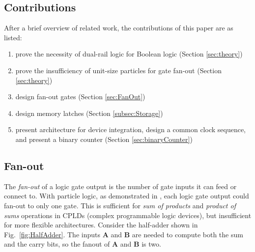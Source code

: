 \documentclass[letterpaper, 10 pt, conference]{ieeeconf}
\begin{document}
    \subsection{Contributions}
  
 After a brief overview of related work,  the contributions of this paper are as listed:
  \begin{enumerate}
  \item prove the necessity of dual-rail logic for Boolean logic (Section \ref{sec:theory})
  \item prove the insufficiency of unit-size particles for gate fan-out (Section \ref{sec:theory})
  \item design {\sc fan-out} gates (Section \ref{sec:FanOut})
  \item design memory latches (Section \ref{subsec:Storage})
  \item present architecture for device integration, design a common clock sequence, and present a binary counter (Section \ref{sec:binaryCounter})
    \end{enumerate}
  
  
  \subsection{Fan-out}
  
  The \emph{fan-out} of a logic gate output is the number of gate inputs it can feed or connect to.  With particle logic, as demonstrated in  \cite{Becker2014}, each logic gate output could fan-out to only one gate.  This is sufficient for \emph{sum of products} and \emph{product of sums}  operations in CPLDs (complex programmable logic devices), but insufficient for more flexible architectures.
%  
    Consider the half-adder shown in Fig.~\ref{fig:HalfAdder}.  The inputs $\mathbf{A}$ and  $\mathbf{B}$ are needed to compute both the {\sc sum} and the {\sc carry} bits, so the fanout of $\mathbf{A}$ and  $\mathbf{B}$ is two.
  
\end{document}
